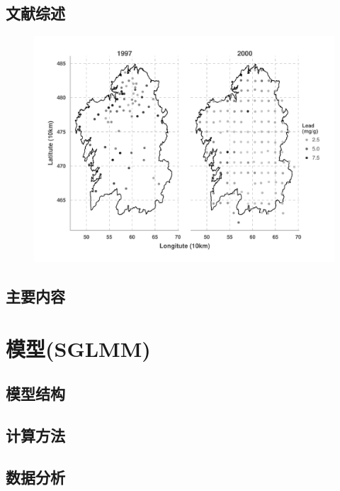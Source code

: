 \documentclass[9pt,compress,xcolor=x11names,UTF8]{beamer}
\begin{document}
\subsection{文献综述}

\begin{frame}
\begin{figure}
\centering
\includegraphics[width=.8\textwidth]{demo04}  
\end{figure}
\end{frame}

\subsection{主要内容}


\section{模型(SGLMM)}

\subsection{模型结构}

\subsection{计算方法}

\subsection{数据分析}
\end{document}
